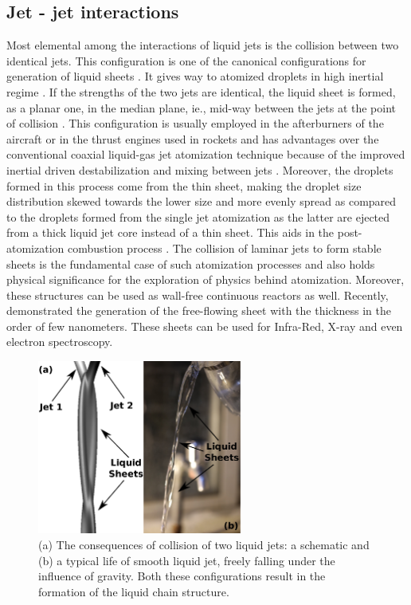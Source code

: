 \subsection{Jet - jet interactions}\label{section::jetJet}
Most elemental among the interactions of liquid jets is the collision between two identical jets. This configuration is one of the canonical configurations for generation of liquid sheets \citep{wadhwa2013noncoalescence}. It gives way to atomized droplets in high inertial regime \citep{bremond2006atomization}. If the strengths of the two jets are identical, the liquid sheet is formed, as a planar one, in the median plane, ie., mid-way between the jets at the point of collision \citep{bush2004collision}. This configuration is usually employed in the afterburners of the aircraft or in the thrust engines used in rockets \citep{chen2013high} and has advantages over the conventional coaxial liquid-gas jet atomization technique because of the improved inertial driven destabilization and mixing between jets \citep{erni2013free}. Moreover, the droplets formed in this process come from the thin sheet, making the droplet size distribution skewed towards the lower size and more evenly spread \citep{inoue2008study,inoue2009liquid} as compared to the droplets formed from the single jet atomization as the latter are ejected from a thick liquid jet core instead of a thin sheet. This aids in the post-atomization combustion process \citep{lhuissier2011destabilization}. The collision of laminar jets to form stable sheets is the fundamental case of such atomization processes and also holds physical significance for the exploration of physics behind atomization. Moreover, these structures can be used as wall-free continuous reactors \citep{erni2013free} as well. Recently, \citet{koralek2018generation} demonstrated the generation of the free-flowing sheet with the thickness in the order of few nanometers. These sheets can be used for Infra-Red, X-ray and even electron spectroscopy.\\
\begin{figure}
\centering
\includegraphics[width=0.6\textwidth]{chapters/introduction/LinkChain}
\caption{(a) The consequences of collision of two liquid jets: a schematic and (b) a typical life of smooth liquid jet, freely falling under the influence of gravity. Both these configurations result in the formation of the liquid chain structure.}
\label{Figure::JetJetSchematic}
\end{figure}
